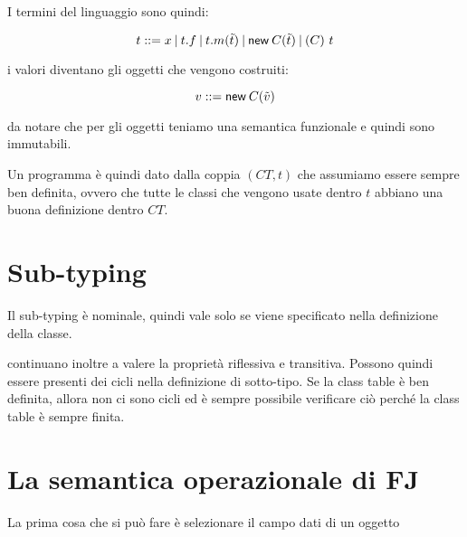 \noindent I termini del linguaggio sono quindi:

$$
t ::= x \vbar t.f \vbar t.m(\tilde{t}) \vbar \new{C}{\tilde{t}} \vbar (C) \ t
$$

\noindent i valori diventano gli oggetti che vengono costruiti:

$$
v ::= \new{C}{\tilde{v}}
$$

da notare che per gli oggetti teniamo una semantica funzionale e quindi sono immutabili.

Un programma è quindi dato dalla coppia $(CT, t)$ che assumiamo essere sempre ben definita, ovvero che tutte le classi che vengono usate dentro $t$ abbiano una buona definizione dentro $CT$.

\section{Sub-typing}

Il sub-typing è nominale, quindi vale solo se viene specificato nella definizione della classe.

\begin{prooftree}
\end{prooftree}

continuano inoltre a valere la proprietà riflessiva e transitiva.
Possono quindi essere presenti dei cicli nella definizione di sotto-tipo. Se la class table è ben definita, allora non ci sono cicli ed è sempre possibile verificare ciò perché la class table è sempre finita.


\section{La semantica operazionale di FJ}

La prima cosa che si può fare è selezionare il campo dati di un oggetto

\begin{center}
\begin{bprooftree}
\end{bprooftree}
\begin{bprooftree}
\end{bprooftree}
\end{center}

